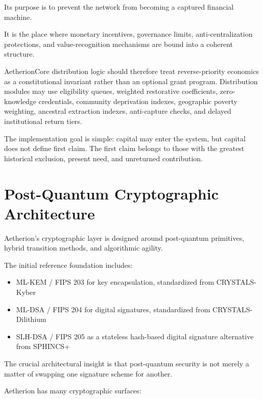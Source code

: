 ﻿\documentclass[12pt]{article}
\begin{document}
Its purpose is to prevent the network from becoming a captured financial machine.

It is the place where monetary incentives, governance limits, anti-centralization protections, and value-recognition mechanisms are bound into a coherent structure.

AetherionCore distribution logic should therefore treat reverse-priority economics as a constitutional invariant rather than an optional grant program. Distribution modules may use eligibility queues, weighted restorative coefficients, zero-knowledge credentials, community deprivation indexes, geographic poverty weighting, ancestral extraction indexes, anti-capture checks, and delayed institutional return tiers.

The implementation goal is simple: capital may enter the system, but capital does not define first claim. The first claim belongs to those with the greatest historical exclusion, present need, and unreturned contribution.

\section{Post-Quantum Cryptographic Architecture}


Aetherion's cryptographic layer is designed around post-quantum primitives, hybrid transition methods, and algorithmic agility.

The initial reference foundation includes:

\begin{itemize}
  \item ML-KEM / FIPS 203 for key encapsulation, standardized from CRYSTALS-Kyber
  \item ML-DSA / FIPS 204 for digital signatures, standardized from CRYSTALS-Dilithium
  \item SLH-DSA / FIPS 205 as a stateless hash-based digital signature alternative from SPHINCS+
\end{itemize}

The crucial architectural insight is that post-quantum security is not merely a matter of swapping one signature scheme for another.

Aetherion has many cryptographic surfaces:
\end{document}
